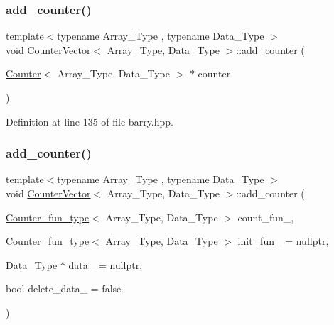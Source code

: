 \mbox{\label{classbarry_1_1_counter_vector_a062d52e18f1d3ba4c00cbf4c2d89f1e7}} 
\subsubsection{\texorpdfstring{add\+\_\+counter()}{add\_counter()}\hspace{0.1cm}{\footnotesize\ttfamily [2/3]}}
{\footnotesize\ttfamily template$<$typename Array\+\_\+\+Type , typename Data\+\_\+\+Type $>$ \\
void \hyperlink{classbarry_1_1_counter_vector}{Counter\+Vector}$<$ Array\+\_\+\+Type, Data\+\_\+\+Type $>$\+::add\+\_\+counter (\begin{DoxyParamCaption}\item[{\hyperlink{classbarry_1_1_counter}{Counter}$<$ Array\+\_\+\+Type, Data\+\_\+\+Type $>$ $\ast$}]{counter }\end{DoxyParamCaption})\hspace{0.3cm}{\ttfamily [inline]}}



Definition at line 135 of file barry.\+hpp.

\mbox{\label{classbarry_1_1_counter_vector_adb32ff1af45bc05a292a5cb064dc414d}} 
\subsubsection{\texorpdfstring{add\+\_\+counter()}{add\_counter()}\hspace{0.1cm}{\footnotesize\ttfamily [3/3]}}
{\footnotesize\ttfamily template$<$typename Array\+\_\+\+Type , typename Data\+\_\+\+Type $>$ \\
void \hyperlink{classbarry_1_1_counter_vector}{Counter\+Vector}$<$ Array\+\_\+\+Type, Data\+\_\+\+Type $>$\+::add\+\_\+counter (\begin{DoxyParamCaption}\item[{\hyperlink{namespacebarry_abaaae3200da8e4b7faac3c04fe9c3081}{Counter\+\_\+fun\+\_\+type}$<$ Array\+\_\+\+Type, Data\+\_\+\+Type $>$}]{count\+\_\+fun\+\_\+,  }\item[{\hyperlink{namespacebarry_abaaae3200da8e4b7faac3c04fe9c3081}{Counter\+\_\+fun\+\_\+type}$<$ Array\+\_\+\+Type, Data\+\_\+\+Type $>$}]{init\+\_\+fun\+\_\+ = {\ttfamily nullptr},  }\item[{Data\+\_\+\+Type $\ast$}]{data\+\_\+ = {\ttfamily nullptr},  }\item[{bool}]{delete\+\_\+data\+\_\+ = {\ttfamily false} }\end{DoxyParamCaption})\hspace{0.3cm}{\ttfamily [inline]}}



